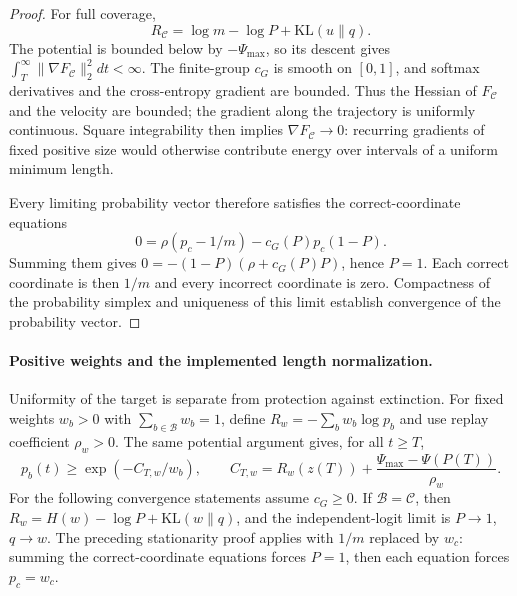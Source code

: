 \documentclass{article}
\newcommand{\enforcehalffinalproseline}{%
  \setlength{\parfillskip}{0pt plus .20\linewidth}}
\newcommand{\1}{\mathbf 1}
\theoremstyle{remark}
\theoremstyle{definition}
\theoremstyle{plain}
\begin{document}
\begin{proof}
\enforcehalffinalproseline
For full coverage,
\begin{equation}
 R_{\mathcal C}=\log m-\log P+\mathrm{KL}(u\|q).
 \label{eq:replay-mass-uniformity-decomposition}
\end{equation}
The potential is bounded below by $-\Psi_{\max}$, so its descent gives
$\int_T^\infty\|\nabla F_{\mathcal C}\|_2^2dt<\infty$. The finite-group
$c_G$ is smooth on $[0,1]$, and softmax derivatives and the cross-entropy
gradient are bounded. Thus the Hessian of $F_{\mathcal C}$ and the velocity
are bounded; the gradient along the trajectory is uniformly continuous.
Square integrability then implies $\nabla F_{\mathcal C}\to0$: recurring
gradients of fixed positive size would otherwise contribute energy over
intervals of a uniform minimum length.

Every limiting probability vector therefore satisfies the correct-coordinate
equations
\[
 0=\rho(p_c-1/m)-c_G(P)p_c(1-P).
\]
Summing them gives $0=-(1-P)(\rho+c_G(P)P)$, hence $P=1$. Each correct
coordinate is then $1/m$ and every incorrect coordinate is zero. Compactness
of the probability simplex and uniqueness of this limit establish convergence
of the probability vector.
\end{proof}

\paragraph{Positive weights and the implemented length normalization.}
Uniformity of the target is separate from protection against extinction.
For fixed weights $w_b>0$ with $\sum_{b\in\mathcal B}w_b=1$, define
$R_w=-\sum_b w_b\log p_b$ and use replay coefficient $\rho_w>0$.
The same potential argument gives, for all $t\ge T$,
\[
 p_b(t)\ge\exp(-C_{T,w}/w_b),\qquad
 C_{T,w}=R_w(z(T))+\frac{\Psi_{\max}-\Psi(P(T))}{\rho_w}.
\]
For the following convergence statements assume $c_G\ge0$.
If $\mathcal B=\mathcal C$, then
$R_w=H(w)-\log P+\mathrm{KL}(w\|q)$, and the independent-logit limit is
$P\to1$, $q\to w$. The preceding stationarity proof applies with $1/m$
replaced by $w_c$: summing the correct-coordinate equations forces $P=1$,
then each equation forces $p_c=w_c$.
\end{document}
